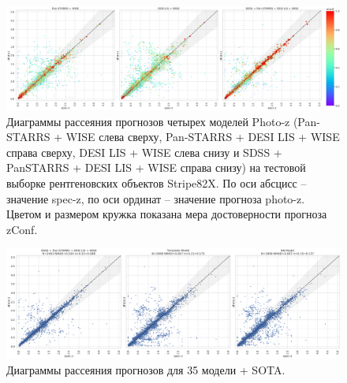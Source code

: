 \documentclass[fleqn,usenatbib]{mnras}
\begin{document}
\begin{figure}
    \centering
    \includegraphics[width=0.9\linewidth]{images/scatterplots-stripe82x.png}
    \caption{Диаграммы рассеяния прогнозов четырех моделей Photo-z (Pan-STARRS + WISE слева сверху, Pan-STARRS + DESI LIS + WISE справа сверху, DESI LIS + WISE слева снизу и SDSS + PanSTARRS + DESI LIS + WISE справа снизу) на тестовой выборке рентгеновских объектов Stripe82X. По оси абсцисс -- значение spec-z, по оси ординат -- значение прогноза photo-z. Цветом и размером кружка показана мера достоверности прогноза zConf.}
    \label{fig:s82x}
\end{figure}

\begin{figure}
    \centering
    \includegraphics[width=0.9\linewidth]{images/scatterplots-stripe82x-sota.png}
    \caption{Диаграммы рассеяния прогнозов для 35 модели + SOTA.}
    \label{fig:s82x}
\end{figure}
\end{document}
